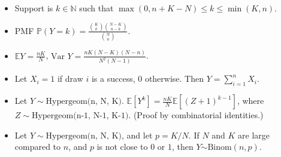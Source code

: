 \documentclass[twoside]{article}
\newcommand\bbE{\mathbb{E}}
\newcommand\bbN{\mathbb{N}}
\newcommand\bbP{\mathbb{P}}
\newcommand\var{\text{Var }}
\begin{document}
\begin{itemize}
\item Support is $k \in \bbN$ such that $\max(0, n + K - N) \leq k \leq \min(K, n)$.

\item PMF $\bbP(Y = k) = \displaystyle\frac{\binom{K}{k}\binom{N-K}{n-k}}{\binom{N}{n}}$.

\item $\bbE Y = \displaystyle\frac{nK}{N}$, $\var Y = \displaystyle\frac{nK(N-K)(N-n)}{N^2(N-1)}$.

\item Let $X_i = 1$ if draw $i$ is a success, 0 otherwise. Then $Y = \displaystyle\sum_{i=1}^n X_i$.

\item Let $Y \sim \text{Hypergeom(n, N, K)}$.  $\bbE [Y^k] = \displaystyle\frac{nK}{N}\bbE \left[ (Z + 1)^{k-1} \right]$, where $Z \sim \text{Hypergeom(n-1, N-1, K-1)}$. (Proof by combinatorial identities.)

\item Let $Y \sim \text{Hypergeom(n, N, K)}$, and let $p = K/N$. If $N$ and $K$ are large compared to $n$, and $p$ is not close to $0$ or $1$, then $Y \dot{\sim} \text{Binom}(n,p)$.

\end{itemize}

\end{document}
